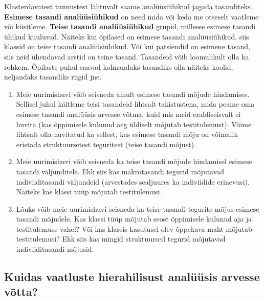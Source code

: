 \documentclass[
]{book}
\begin{document}
Klasterdavatest tunnustest lähtuvalt saame analüüsiühikud jagada tasanditeks. \textbf{Esimese tasandi analüüsiühikud} on need mida või keda me otseselt vaatleme või küsitleme. \textbf{Teise tasandi analüüsiühikud} grupid, millesse esimese tasandi ühikud kuuluvad. Näiteks kui õpilased on esimese tasandi analüüsiühikud, siis klassid on teise tasandi analüüsiühikud. Või kui patsiendid on esimene tasand, siis neid ühendavad arstid on teine tasand. Tasandeid võib loomulikult olla ka rohkem. Õpilaste puhul saavad kolmandaks tasandiks olla näiteks koolid, neljandaks tasandiks riigid jne.

\begin{enumerate}
\def\labelenumi{\arabic{enumi}.}
\item
  Meie uurimishuvi võib seisneda ainult esimese tasandi mõjude hindamises. Sellisel juhul käitleme teisi tasandeid lihtsalt takistustena, mida peame oma esimese tasandi analüüsis arvesse võtma, kuid mis meid eraldiseisvalt ei huvita (kas õppimisele kulunud aeg üldiselt mõjutab testitulemust). Võime lihtsalt olla huvitatud ka sellest, kas esimese tasandi mõju on võimalik eristada struktuursetest teguritest (teise tasandi mõjust).
\item
  Meie uurimishuvi võib seisneda ka teise tasandi mõjude hindamisel esimese tasandi väljunditele. Ehk siis kas makrotasandi tegurid mõjutavad indiviiditasandi väljundeid (arvestades sealjuures ka indiviidide erinevusi). Näiteks kas klassi tüüp mõjutab testitulemusi.
\item
  Lõuks võib meie uurimishuvi seisneda ka teise tasandi tegurite mõjus esimese tasandi mõjudele. Kas klassi tüüp mõjutab seost õppimisele kulunud aja ja testitulemuse vahel? Või kas klassis kasutusel olev õppekava maht mõjutab testitulemusi? Ehk siis kas mingid struktuursed tegurid mõjutavad indiviiditasandi mõjusid.
\end{enumerate}

\hypertarget{kuidas-vaatluste-hierahilisust-analuxfcuxfcsis-arvesse-vuxf5tta}{%
\subsection{Kuidas vaatluste hierahilisust analüüsis arvesse võtta?}\label{kuidas-vaatluste-hierahilisust-analuxfcuxfcsis-arvesse-vuxf5tta}}
\end{document}
